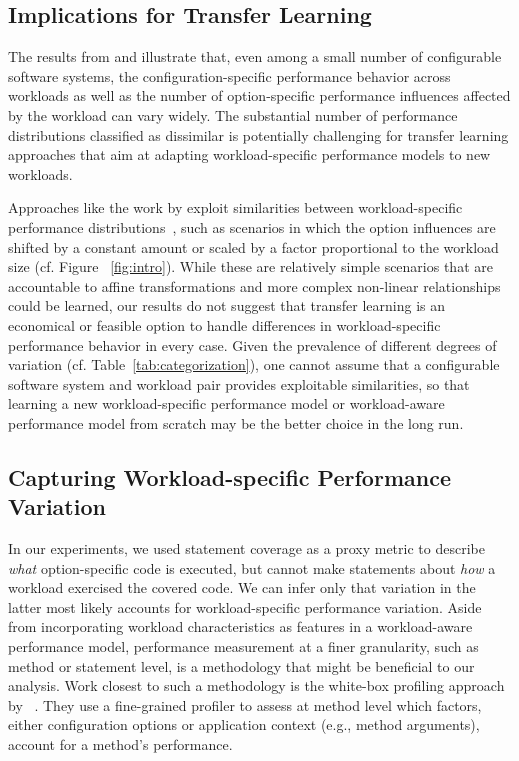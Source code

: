 \subsection{Implications for Transfer Learning}
The results from  and  illustrate that, even among a small number of configurable software systems, the configuration-specific performance behavior across workloads as well as the number of option-specific performance influences affected by the workload can vary widely. The substantial number of performance distributions classified as dissimilar is potentially challenging for transfer learning approaches that aim at adapting workload-specific performance models to new
workloads. 

Approaches like the work by \citeauthor{jamshidi_learning_2018} exploit similarities between workload-specific performance distributions~\cite{jamshidi_learning_2018}, such as scenarios in which the option influences are shifted by a constant amount or scaled by a factor proportional to the workload size (cf. Figure ~\ref{fig:intro}). While these are relatively simple scenarios that are accountable to affine transformations and more complex non-linear relationships could be learned, our results do not suggest that transfer learning is an economical or feasible option to handle differences in workload-specific performance behavior in
every case. Given the prevalence of different degrees of variation (cf. Table~\ref{tab:categorization}), one cannot assume that a configurable software system
and workload pair provides exploitable similarities, so that learning a new workload-specific performance model or workload-aware performance model from scratch may be the better choice in the long run.

\subsection{Capturing Workload-specific Performance Variation}
In our experiments, we used statement coverage as a proxy metric to describe \emph{what} option-specific code is executed, but cannot make statements about \emph{how} a workload exercised the covered code. We can infer only that variation in the latter most likely accounts for workload-specific performance variation. Aside from incorporating workload characteristics as features in a workload-aware performance model, performance measurement at a finer granularity, such as method or statement level, is a methodology that might be beneficial to our analysis. Work closest to such a methodology is the white-box profiling approach by \citeauthor{weber_white_2021}~\cite{weber_white_2021}. They use a fine-grained profiler to assess at method level which factors, either configuration options or application context (e.g., method arguments), account for a method's performance. 

